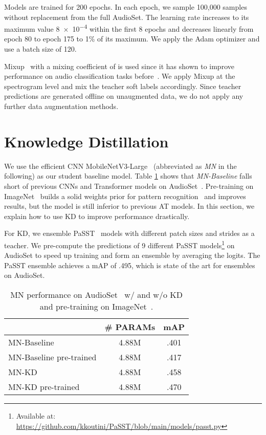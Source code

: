 \documentclass{article}
\begin{document}
Models are trained for 200 epochs. In each epoch, we sample 100,000 samples without replacement from the full AudioSet. The learning rate increases to its maximum value \num{8e-4} within the first 8 epochs and decreases linearly from epoch 80 to epoch 175 to 1\% of its maximum. We apply the Adam optimizer and use a batch size of 120.



Mixup~\cite{Zhang18mixup} with a mixing coefficient of  is used since it has shown to improve performance on audio classification tasks before~\cite{Koutini21Receptive, Gong21Ast}. We apply Mixup at the spectrogram level and mix the teacher soft labels accordingly. Since teacher predictions are generated offline on unaugmented data, we do not apply any further data augmentation methods.





\vspace{-6pt}
\section{Knowledge Distillation}

We use the efficient CNN MobileNetV3-Large~\cite{Howard19MobileNetV3} (abbreviated as \textit{MN} in the following) as our student baseline model. Table \ref{tab:baseline} shows that \textit{MN-Baseline} falls short of previous CNNs and Transformer models on AudioSet~\cite{audioset2017Gemmeke}. Pre-training on ImageNet~\cite{Deng09ImageNet} builds a solid weights prior for pattern recognition~\cite{Chen22HTS-AT} and improves results, but the model is still inferior to previous AT models. In this section, we explain how to use KD to improve performance drastically.

For KD, we ensemble PaSST~\cite{Koutini21Passt} models with different patch sizes and strides as a teacher. We pre-compute the predictions of 9 different PaSST models\footnote{Available at: \url{https://github.com/kkoutini/PaSST/blob/main/models/passt.py}} on AudioSet to speed up training and form an ensemble by averaging the logits.
The PaSST ensemble achieves a mAP of .495, which is state of the art for ensembles on AudioSet. 

\begin{table}[t]
\begin{center}
\begin{small}
\begin{tabular}{lcc}
 & \textbf{\# PARAMs} & \textbf{mAP} \\ 
\midrule
MN-Baseline & 4.88M & .401 \\
MN-Baseline pre-trained & 4.88M & .417 \\
\midrule
MN-KD & 4.88M & .458 \\
MN-KD pre-trained & 4.88M & .470 \\  
\bottomrule
\end{tabular}
\caption{MN performance on AudioSet~\cite{audioset2017Gemmeke} w/ and w/o KD and pre-training on ImageNet~\cite{Deng09ImageNet}.} 
\label{tab:baseline}
\end{small}
\end{center}
\vspace{-16pt}
\end{table}
\end{document}
